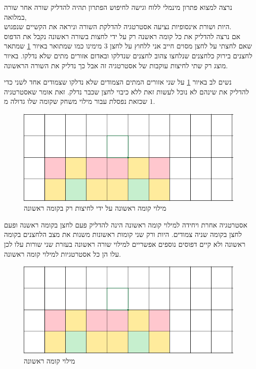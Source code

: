 \documentclass[12pt,leqno]{article}
\begin{document}
נרצה למצוא פתרון מינמלי ללוח
וגישה לחיפוש הפתרון תהיה
להדליק שורה אחר שורה במלואה,
\\
היות ושורת אינסופיות נציעה אסטרטגיה להדלקת השורה וניראה את הקשיים שנפגוש.
\\
אם נרצה להדליק 
את כל קומה ראשנה רק על ידי לחצות 
בשורה ראשונה נקבל את הדפוס 
שאם לחצתי על לחצן מסוים חייב אני ללחוץ על לחצן
$3$
מימינו
כמו שמתואר באיור
\ref{fig: fill first stage only pressing first stage}
שמתאר לחצנים בירוק כלחצנים שנלחצו 
צהוב לחצנים שנדלקו ובאדום אזורים מתים שלא נדלקו.
באיור מוצג רק שתי לחיצות עוקבות של אסטרטגיה זה אבל כך נדליק את השורה הראשונה.

נשים לב באיור 
\ref{fig: fill first stage only pressing first stage}
על שני אזורים המתים הצמודים שלא נדלקו שצמודים אחד לשני כדי להדליק את שינהם
לא נוכל לעשות זאת ללא כיבוי לחצן שכבר נדלק.
זאת אומר שאסטרטגיה שכזאת
נפסלת עבור מילוי משחק שקומה שלו גדולה מ
$1$.

\begin{figure}[ht]
    \caption{מילוי קומה ראשונה על ידי לחיצות רק בקומה ראשונה}
    \label{fig: fill first stage only pressing first stage}
    \centering
    \includegraphics[width=.7\textwidth,height=.7\textheight,keepaspectratio]{images/first_stage_fill_only_first_stage_click.PNG}
\end{figure}

אסטרטגיה אחרת ויחידה למילוי קומה ראשונה הינה להדליק 
פעם לחצן בקומה ראשנה 
ופעם לחצן בקומה שניה צמודים.
היות ורק שני קומות ראשונות משנות את מצב הלחצנים בקומה ראשונה ולא קיים דפוסים נוספים
אפשריים למילוי שורה ראשונה בעזרת שני שורות עלו לכן עלו הן כל אסטרטגיות למילוי קומה ראשונה.

\begin{figure}[ht]
    \caption{מילוי קומה ראשונה}
    \label{fig: fill first stage second attempt}
    \centering
    \includegraphics[width=.7\textwidth,height=.7\textheight,keepaspectratio]{images/first_stage_fill_only_first_stage_click.PNG}
\end{figure}
\end{document}
